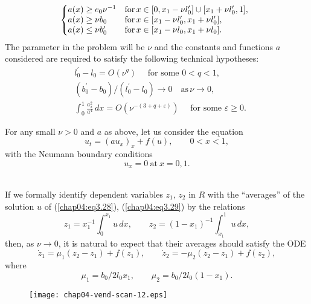 \documentclass{surv-l}
\theoremstyle{plain}
\theoremstyle{definition}
\numberwithin{equation}{section}
\numberwithin{figure}{chapter}
\begin{document}
\begin{align}\label{chap04:eq3.26}
\displaystyle\left\{\begin{array}{@{}ll}
a(x)\geq e_{0}\nu^{-1} & \mathrm{for}\, x\in[0, x_{1}-\nu l_{0}^{\prime}]\cup[x_{1}+\nu
l_{0}^{\prime}, 1],\\
a(x)\geq \nu b_{0} & \mathrm{for}\, x\in[x_{1}-\nu l^{\prime}_{0}, x_{1}+\nu l_{0}^{\prime}],\\
a(x)\leq \nu b^{\prime}_{0} & \mathrm{for}\, x\in[x_{1}-\nu l_{0}, x_{1}+\nu l_{0}].
\end{array}\right.
\end{align}
The parameter in the problem will be $\nu$ and the constants and functions $a$ considered are required to satisfy the following technical hypotheses:
\begin{equation}\label{chap04:eq3.27}
\begin{split}
&{l^{\prime}_{0}}-l_0=O(\nu^{q})\quad \text{ for some } 0<q<1,\\
&({b^{\prime}_0}-b_{0})/(l^{\prime}_{0}-l_{0})\rightarrow 0\quad \mathrm{as} \,\nu\rightarrow 0,\\
&\int_{0}^{1}\frac{a_{x}^{2}}{a^{4}}\,dx=O(\nu^{-(3+q+\varepsilon)})\quad \text{ for some } \varepsilon \geq 0.
\end{split}
\end{equation}

For any small $\nu >0$ and $a$ as above, let us consider the equation
\begin{equation}\label{chap04:eq3.28}
u_{t}=(au_{x})_{x}+f(u),\qquad 0<x<1,
\end{equation}
with the Neumann boundary conditions
\begin{equation}\label{chap04:eq3.29}
u_{x}=0\ \mathrm{at}\ x=0,1.
\end{equation}\

If we formally identify dependent variables $z_{1},\,z_{2}$ in $R$ with the ``averages'' of the solution $u$ of (\ref{chap04:eq3.28}), (\ref{chap04:eq3.29}) by the relations
\begin{equation*}
z_{1}=x_{1}^{-1}\int_{0}^{x_{1}}u\,dx, \qquad z_{2}=(1-x_{1})^{-1}\int_{x_{1}}^{1}u\,dx,
\end{equation*}
then, as $\nu \rightarrow 0$, it is natural to expect that their averages should satisfy the ODE
\begin{equation}\label{chap04:eq3.30}
\dot{z}_{1}=\mu_{1}(z_{2}-z_{1})+f(z_{1}), \qquad \dot{z}_{2}=-\mu_{2}(z_{2}-z_{1})+f(z_{2}),
\end{equation}
where
\begin{equation}\label{chap04:eq3.31}
\mu_{1}=b_{0}/2l_{0}x_{1},\qquad \mu_{2}=b_{0}/2l_{0}(1-x_{1}).
\end{equation}
\begin{figure}
\texttt{[image: chap04-vend-scan-12.eps]}
\caption{}\label{fig3.10}
\end{figure}
\end{document}
